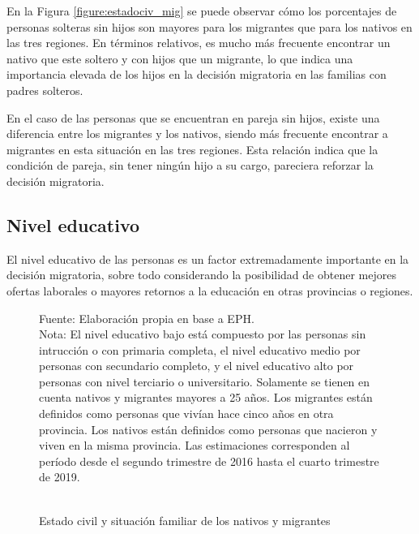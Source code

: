 \documentclass[12pt,a4paper]{article}
\begin{document}
En la Figura \ref{figure:estadociv_mig} se puede observar cómo los porcentajes de personas solteras sin hijos son mayores para los migrantes que para los nativos en las tres regiones. En términos relativos, es mucho más frecuente encontrar un nativo que este soltero y con hijos que un migrante, lo que indica una importancia elevada de los hijos en la decisión migratoria en las familias con padres solteros.

En el caso de las personas que se encuentran en pareja sin hijos, existe una diferencia entre los migrantes y los nativos, siendo más frecuente encontrar a migrantes en esta situación en las tres regiones. Esta relación indica que la condición de pareja, sin tener ningún hijo a su cargo, pareciera reforzar la decisión migratoria.

\subsection{Nivel educativo}

El nivel educativo de las personas es un factor extremadamente importante en la decisión migratoria, sobre todo considerando la posibilidad de obtener mejores ofertas laborales o mayores retornos a la educación  en otras provincias o regiones.

\begin{figure}[htbp!]
\begin{center}
\caption{\\Estado civil y situación familiar de los nativos y migrantes}
\label{figure:niveled_mig}
 
\end{center}
\begin{flushleft}
\begin{scriptsize}
Fuente: Elaboración propia en base a EPH.\\
Nota: El nivel educativo bajo está compuesto por las personas sin intrucción o con primaria completa, el nivel educativo medio por personas con secundario completo, y el nivel educativo alto por personas con nivel terciario o universitario. Solamente se tienen en cuenta nativos y migrantes mayores a 25 años. Los migrantes están definidos como personas que vivían hace cinco años en otra provincia. Los nativos están definidos como personas que nacieron y viven en la misma provincia. Las estimaciones corresponden al período desde el segundo trimestre de 2016 hasta el cuarto trimestre de 2019.\\
\end{scriptsize}
\end{flushleft}
\end{figure}
\end{document}
